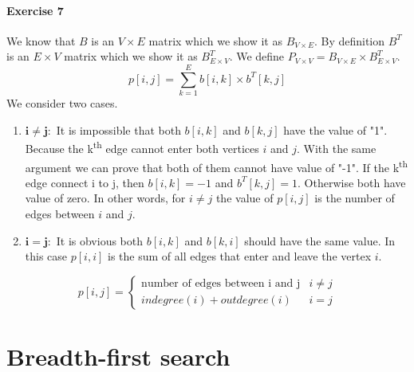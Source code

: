 \documentclass{book}
\begin{document}
	\paragraph{Exercise 7}
	We know that $B$ is an $V \times E$ matrix which we show it as $B_{V \times E}$. By definition $B^T$ is an $E \times V$ matrix which we show it as $B_{E \times V}^T$. We define $P_{V \times V} = B_{V \times E} \times B_{E \times V}^T$.
	\begin{equation*}
		p[i, j] = \sum_{k = 1}^{E}b[i, k] \times b^T[k, j]
	\end{equation*}
	We consider two cases.
	\begin{enumerate}
		\item $\boldsymbol{i \ne j:}$ It is impossible that both $b[i, k]$ and $b[k, j]$ have the value of "1". Because the k\textsuperscript{th} edge cannot enter both vertices $i$ and $j$. With the same argument we can prove that both of them cannot have value of "-1". If the k\textsuperscript{th} edge connect i to j, then $b[i, k] = -1$ and $b^T[k, j] = 1$. Otherwise both have value of zero. In other words, for $i \ne j$ the value of $p[i, j]$ is the number of edges between $i$ and $j$.
		\item $\boldsymbol{i = j:}$ It is obvious both $b[i, k]$ and $b[k, i]$ should have the same value. In this case $p[i, i]$ is the sum of all edges that enter and leave the vertex $i$.
	\end{enumerate}
	\begin{equation*}
		p[i, j] = \begin{cases}
		\text{number of edges between i and j} & i \ne j \\
		indegree(i) + outdegree(i) & i = j
		\end{cases}
	\end{equation*}
	\section{Breadth-first search}
\end{document}

